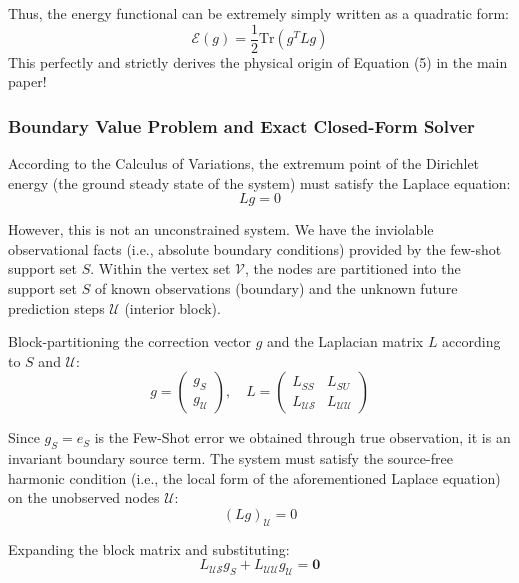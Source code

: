 \documentclass{article}
\begin{document}
Thus, the energy functional can be extremely simply written as a quadratic form:
\begin{equation}
\mathcal{E}(g) = \frac{1}{2}\text{Tr}(g^T L g)
\end{equation}
This perfectly and strictly derives the physical origin of Equation (5) in the main paper!

\subsubsection{Boundary Value Problem and Exact Closed-Form Solver}

According to the Calculus of Variations, the extremum point of the Dirichlet energy (the ground steady state of the system) must satisfy the Laplace equation:
\begin{equation}
L g = 0
\end{equation}

However, this is not an unconstrained system. We have the inviolable observational facts (i.e., absolute boundary conditions) provided by the few-shot support set $S$. Within the vertex set $\mathcal{V}$, the nodes are partitioned into the support set $S$ of known observations (boundary) and the unknown future prediction steps $\mathcal{U}$ (interior block).

Block-partitioning the correction vector $g$ and the Laplacian matrix $L$ according to $S$ and $\mathcal{U}$:
\begin{equation}
g = \begin{pmatrix} g_S \\ g_{\mathcal{U}} \end{pmatrix}, \quad 
L = \begin{pmatrix} L_{SS} & L_{SU} \\ L_{\mathcal{US}} & L_{\mathcal{UU}} \end{pmatrix}
\end{equation}

Since $g_S = e_S$ is the Few-Shot error we obtained through true observation, it is an invariant boundary source term. The system must satisfy the source-free harmonic condition (i.e., the local form of the aforementioned Laplace equation) on the unobserved nodes $\mathcal{U}$:
\begin{equation}
(L g)_{\mathcal{U}} = 0
\end{equation}

Expanding the block matrix and substituting:
\begin{equation}
L_{\mathcal{US}} g_S + L_{\mathcal{UU}} g_{\mathcal{U}} = \mathbf{0}
\end{equation}
\end{document}
